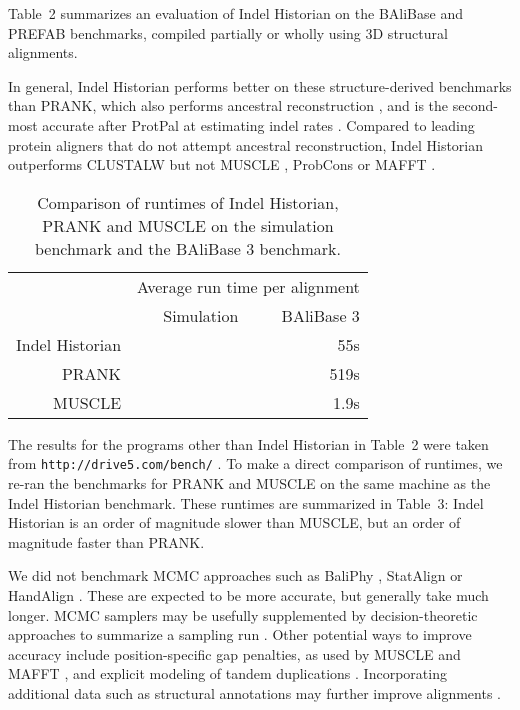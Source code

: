 \documentclass{bioinfo}
\begin{document}
Table~2 summarizes an evaluation of Indel Historian
on the BAliBase and PREFAB benchmarks,
compiled partially or wholly using 3D structural alignments.

In general, Indel Historian performs better on these structure-derived benchmarks than PRANK,
which also performs ancestral reconstruction \citep{LoytynojaGoldman2008},
and is the second-most accurate after ProtPal at estimating indel rates \citep{Westesson2012-zg}.
Compared to leading protein aligners that do not attempt ancestral reconstruction,
Indel Historian outperforms CLUSTALW \citep{LarkinEtAl2007} but not MUSCLE \citep{Edgar2004b},
ProbCons \citep{DoEtAl2005} or MAFFT \citep{KatohEtAl2005}.

\begin{table}
  \begin{tabular}{r|rr}
    & \multicolumn{2}{c}{Average run time per alignment} \\
 & Simulation & BAliBase 3 \\
    \hline
Indel Historian & & 55s \\
PRANK & & 519s \\
MUSCLE & & 1.9s \\
\end{tabular}
\caption{
    Comparison of runtimes of Indel Historian, PRANK and MUSCLE on the simulation benchmark and the BAliBase 3 benchmark.
  }
\end{table}

The results for the programs other than Indel Historian in Table~2 were taken from {\tt http://drive5.com/bench/} \citep{Edgar2010}.
To make a direct comparison of runtimes, we re-ran the benchmarks for PRANK and MUSCLE on the same machine as the Indel Historian benchmark.
These runtimes are summarized in Table~3: Indel Historian is an order of magnitude slower than MUSCLE, but an order of magnitude faster than PRANK.

We did not benchmark MCMC approaches
such as BaliPhy \citep{Redelings2014}, StatAlign \citep{NovakEtAl2008} or HandAlign \citep{WestessonBarquistHolmes2012}.
These are expected to be more accurate, but generally take much longer.
MCMC samplers may be usefully supplemented by decision-theoretic approaches to summarize a sampling run \citep{HermanEtAl2015}.
Other potential ways to improve accuracy include position-specific gap penalties, as used by MUSCLE \citep{Edgar2004b} and MAFFT \citep{KatohEtAl2005},
and explicit modeling of tandem duplications \citep{SzalkowskiAnisimova2013}.
Incorporating additional data such as structural annotations may further improve alignments \citep{HermanEtAl2014}.
\end{document}
